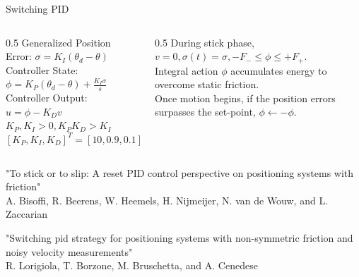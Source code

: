 \documentclass{beamer}
\begin{document}
    \begin{frame}{Switching PID}
        \begin{columns}[c]
            \footnotesize
            \begin{column}{0.5\textwidth}
                \centering
                Generalized Position Error: $\sigma = K_I(\theta_d - \theta)$\\

                \vspace{20pt}
                Controller State: $\phi = K_P(\theta_d - \theta) + \frac{K_I \sigma}{s}$\\

                \vspace{20pt}
                Controller Output: $u = \phi - K_Dv$\\

                \vspace{20pt}
                $K_P, K_I > 0, K_PK_D > K_I$\\

                \vspace{20pt}
                $[K_P, K_I, K_D]^T = [10, 0.9, 0.1]^T$
            \end{column}

            \begin{column}{0.5\textwidth}
                \centering
                During stick phase, $v = 0, \sigma(t) = \sigma, -F_- \le \phi \le +F_+$.\\

                \vspace{20pt}
                Integral action $\phi$ accumulates energy to overcome static friction.\\

                \vspace{20pt}
                Once motion begins, if the position errors surpasses the set-point, $\phi \gets -\phi$.\\
            \end{column}
        \end{columns}

        \vspace{20pt}

        \tiny
        "To stick or to slip: A reset PID control perspective on positioning systems with friction"\\
        A. Bisoffi, R. Beerens, W. Heemels, H. Nijmeijer, N. van de Wouw, and L. Zaccarian\vspace{10pt}

        "Switching pid strategy for positioning systems with non-symmetric friction and noisy velocity measurements"\\
        R. Lorigiola, T. Borzone, M. Bruschetta, and A. Cenedese
    \end{frame}
\end{document}
